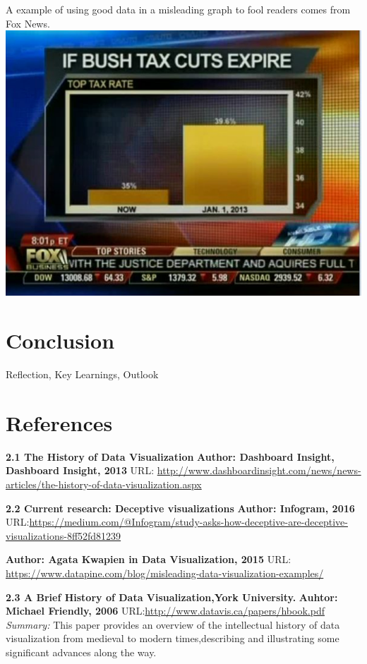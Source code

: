 \documentclass[]{book}
\theoremstyle{definition}
\theoremstyle{definition}
\theoremstyle{definition}
\theoremstyle{remark}
\begin{document}
A example of using good data in a misleading graph to fool readers comes
from Fox News. \includegraphics{images/1.png} \citep{DataMiningVsViz}

\chapter{Conclusion}\label{conclusion}

Reflection, Key Learnings, Outlook

\chapter*{References}\label{references-1}

\textbf{2.1 The History of Data Visualization} \textbf{Author: Dashboard
Insight, Dashboard Insight, 2013} URL:
\url{http://www.dashboardinsight.com/news/news-articles/the-history-of-data-visualization.aspx}

\textbf{2.2 Current research: Deceptive visualizations} \textbf{Author:
Infogram, 2016}
URL:\url{https://medium.com/@Infogram/study-asks-how-deceptive-are-deceptive-visualizations-8ff52fd81239}

\textbf{Author: Agata Kwapien in Data Visualization, 2015} URL:
\url{https://www.datapine.com/blog/misleading-data-visualization-examples/}

\textbf{2.3 A Brief History of Data Visualization,York University.}
\textbf{Auhtor: Michael Friendly, 2006}
URL:\url{http://www.datavis.ca/papers/hbook.pdf} \emph{Summary: } This
paper provides an overview of the intellectual history of data
visualization from medieval to modern times,describing and illustrating
some significant advances along the way.
\end{document}
